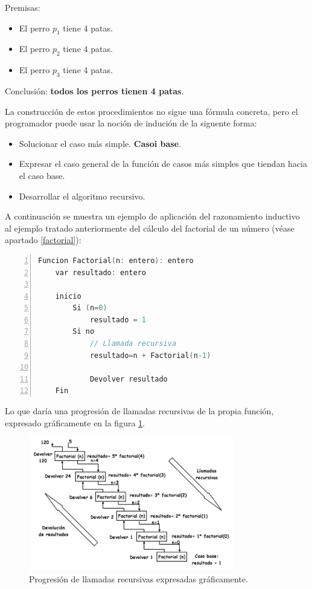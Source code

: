 \documentclass[a4paper, 11pt, titlepage]{article}
\begin{document}
        Premisas:

        \begin{itemize}
            \item El perro $p_1$ tiene 4 patas.
            \item El perro $p_2$ tiene 4 patas.
            \item El perro $p_3$ tiene 4 patas.
        \end{itemize}

        Conclusión: \textbf{todos los perros tienen 4 patas}.

        La construcción de estos procedimientos no sigue una fórmula concreta, pero el programador 
        puede usar la noción de indución de la siguente forma:

        \begin{itemize}
            \item Solucionar el caso más simple. \textbf{Casoi base}.
            \item Expresar el caso general de la función de casos más simples que tiendan hacia el caso base.
            \item Desarrollar el algoritmo recursivo.
        \end{itemize}
        
        A continuación se muestra un ejemplo de aplicación del razonamiento inductivo al ejemplo tratado 
        anteriormente del cálculo del factorial de un número (véase apartado \ref{factorial}):

        \begin{lstlisting}[language=C,numbers=left]
    Funcion Factorial(n: entero): entero 
    var resultado: entero

    inicio
        Si (n=0)
            resultado = 1
        Si no
            // Llamada recursiva
            resultado=n + Factorial(n-1) 
            
            Devolver resultado
    Fin\end{lstlisting}

        Lo que daría una progresión de llamadas recursivas de la propia función, expresado gráficamente en
        la figura \ref{factorial4}.

        \begin{figure}[htp]
            \centering
            \includegraphics[width=0.8\textwidth]{resources/recursividad02.png}
            \caption{Progresión de llamadas recursivas expresadas gráficamente.}
            \label{factorial4}
        \end{figure}
\end{document}
